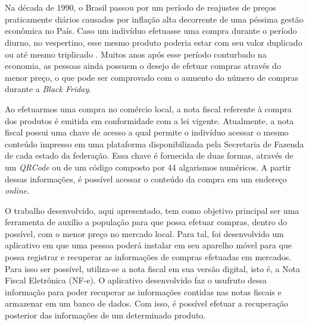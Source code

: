 \chapter*{}
\noindent
{}
\newline
\newline


Na década de 1990, o Brasil passou por um período de reajustes de preços praticamente diários causados por inflação alta decorrente de uma péssima gestão econômica no País. Caso um indivíduo efetuasse uma compra durante o período diurno, no vespertino, esse mesmo produto poderia estar com seu valor duplicado ou até mesmo triplicado\cite{inflacaoEstadoMinas} \cite{inflacaoEstadao}. Muitos anos após esse período conturbado na economia, as pessoas ainda possuem o desejo de efetuar compras através do menor preço, o que pode ser comprovado com o aumento do número de compras durante a \textit{Black Friday}\cite{blackFridayVeja}.

Ao efetuarmos uma compra no comércio local, a nota fiscal referente à compra dos produtos é emitida em conformidade com a lei vigente. Atualmente, a nota fiscal possui uma chave de acesso a qual permite o indivíduo acessar o mesmo conteúdo impresso em uma plataforma disponibilizada pela Secretaria de Fazenda de cada estado da federação. Essa chave é fornecida de duas formas, através de um \textit{QRCode} ou de um código composto por 44 algarismos numéricos. A partir dessas informações, é possível acessar o conteúdo da compra em um endereço \textit{online}\cite{nfceDefinicao}.


O trabalho desenvolvido, aqui apresentado, tem como objetivo principal ser uma ferramenta de auxílio a população para que possa efetuar compras, dentro do possível, com o menor preço no mercado local. Para tal, foi desenvolvido um aplicativo em que uma pessoa poderá instalar em seu aparelho móvel para que possa registrar e recuperar as informações de compras efetuadas em mercados. Para isso ser possível, utiliza-se a nota fiscal em sua versão digital, isto é, a Nota Fiscal Eletrônica (NF-e). O aplicativo desenvolvido faz o usufruto dessa informação para poder recuperar as informações contidas nas notas fiscais e armazenar em um banco de dados. Com isso, é possível efetuar a recuperação posterior das informações de um determinado produto.

